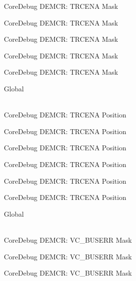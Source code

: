 \begin{DoxyRefList}
\label{deprecated__deprecated000190}%
%
Core\+Debug DEMCR\+: TRCENA Mask 

\label{deprecated__deprecated000332}%
%
Core\+Debug DEMCR\+: TRCENA Mask 

\label{deprecated__deprecated000408}%
%
Core\+Debug DEMCR\+: TRCENA Mask 

\label{deprecated__deprecated000497}%
%
Core\+Debug DEMCR\+: TRCENA Mask 

\label{deprecated__deprecated000599}%
%
Core\+Debug DEMCR\+: TRCENA Mask  
\item[{\parbox[t]{\linewidth}{Global \doxylink{group___c_m_s_i_s___core_debug_ga6ff2102b98f86540224819a1b767ba39}{Core\+Debug\+\_\+\+DEMCR\+\_\+\+TRCENA\+\_\+\+Pos} }}]\hfill \\
\label{deprecated__deprecated000045}%
%
Core\+Debug DEMCR\+: TRCENA Position 

\label{deprecated__deprecated000189}%
%
Core\+Debug DEMCR\+: TRCENA Position 

\label{deprecated__deprecated000331}%
%
Core\+Debug DEMCR\+: TRCENA Position 

\label{deprecated__deprecated000407}%
%
Core\+Debug DEMCR\+: TRCENA Position 

\label{deprecated__deprecated000496}%
%
Core\+Debug DEMCR\+: TRCENA Position 

\label{deprecated__deprecated000598}%
%
Core\+Debug DEMCR\+: TRCENA Position  
\item[{\parbox[t]{\linewidth}{Global \doxylink{group___c_m_s_i_s___core_debug_ga9d29546aefe3ca8662a7fe48dd4a5b2b}{Core\+Debug\+\_\+\+DEMCR\+\_\+\+VC\+\_\+\+BUSERR\+\_\+\+Msk} }}]\hfill \\
\label{deprecated__deprecated000060}%
%
Core\+Debug DEMCR\+: VC\+\_\+\+BUSERR Mask 

\label{deprecated__deprecated000204}%
%
Core\+Debug DEMCR\+: VC\+\_\+\+BUSERR Mask 

\label{deprecated__deprecated000346}%
%
Core\+Debug DEMCR\+: VC\+\_\+\+BUSERR Mask 


\end{DoxyRefList}
